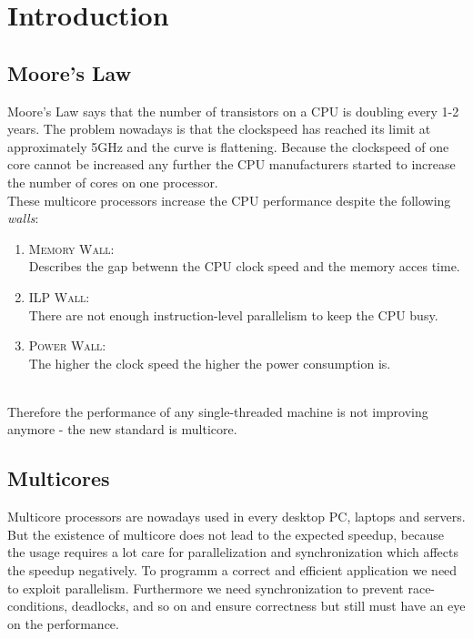 \documentclass{article}
\begin{document}
	\pagestyle{fancy}
	\section*{Introduction}
	\begin{adjustwidth}{2em}{2em}
		\subsection{Moore's Law}
		\begin{adjustwidth}{2em}{2em}
			Moore's Law says that the number of transistors on a CPU is doubling every 1-2 years. The problem nowadays is that the clockspeed has reached its limit at approximately 5GHz and the curve is flattening. Because the clockspeed of one core cannot be increased any further the CPU manufacturers started to increase the number of cores on one processor. \\
			These multicore processors increase the CPU performance despite the following \textit{walls}:
			\begin{enumerate}[-]
				\item \textsc{Memory Wall:} \\
				Describes the gap betwenn the CPU clock speed and the memory acces time.
				\item \textsc{ILP Wall:} \\
				There are not enough instruction-level parallelism to keep the CPU busy.
				\item \textsc{Power Wall:} \\
				The higher the clock speed the higher the power consumption is.
			\end{enumerate}
			\hfill \\
			Therefore the performance of any single-threaded machine is not improving anymore - the new standard is multicore.
		\end{adjustwidth}
		\subsection{Multicores}
		\begin{adjustwidth}{2em}{2em}
			Multicore processors are nowadays used in every desktop PC, laptops and servers. \\
			But the existence of multicore does not lead to the expected speedup, because the usage requires a lot care for parallelization and synchronization which affects the speedup negatively. To programm a correct and efficient application we need to exploit parallelism. Furthermore we need synchronization to prevent race-conditions, deadlocks, and so on and ensure correctness but still must have an eye on the performance.
		\end{adjustwidth}

\end{adjustwidth}
\end{document}
